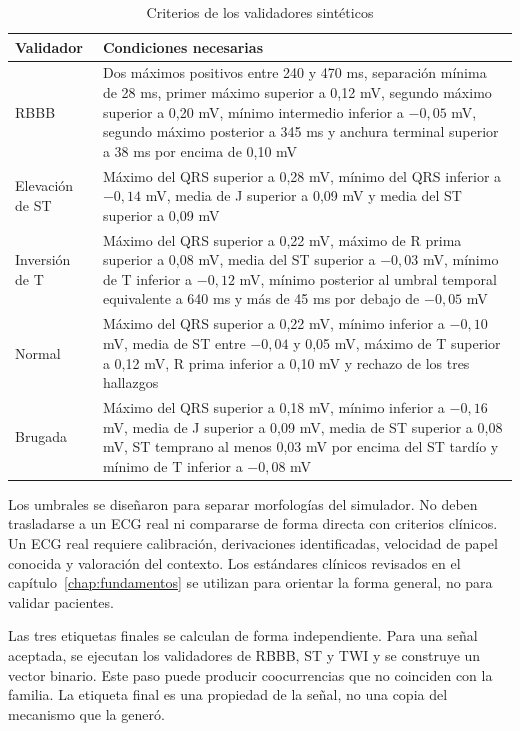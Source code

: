 \begin{table}[H]
\centering
\scriptsize
\begin{tabularx}{\textwidth}{p{2.25cm} X}
\toprule
\textbf{Validador} & \textbf{Condiciones necesarias} \\
\midrule
RBBB &
Dos máximos positivos entre 240 y 470 ms, separación mínima de 28 ms, primer máximo superior a 0,12 mV, segundo máximo superior a 0,20 mV, mínimo intermedio inferior a \(-0,05\) mV, segundo máximo posterior a 345 ms y anchura terminal superior a 38 ms por encima de 0,10 mV \\
Elevación de ST &
Máximo del QRS superior a 0,28 mV, mínimo del QRS inferior a \(-0,14\) mV, media de J superior a 0,09 mV y media del ST superior a 0,09 mV \\
Inversión de T &
Máximo del QRS superior a 0,22 mV, máximo de R prima superior a 0,08 mV, media del ST superior a \(-0,03\) mV, mínimo de T inferior a \(-0,12\) mV, mínimo posterior al umbral temporal equivalente a 640 ms y más de 45 ms por debajo de \(-0,05\) mV \\
Normal &
Máximo del QRS superior a 0,22 mV, mínimo inferior a \(-0,10\) mV, media de ST entre \(-0,04\) y 0,05 mV, máximo de T superior a 0,12 mV, R prima inferior a 0,10 mV y rechazo de los tres hallazgos \\
Brugada &
Máximo del QRS superior a 0,18 mV, mínimo inferior a \(-0,16\) mV, media de J superior a 0,09 mV, media de ST superior a 0,08 mV, ST temprano al menos 0,03 mV por encima del ST tardío y mínimo de T inferior a \(-0,08\) mV \\
\bottomrule
\end{tabularx}
\caption{Criterios de los validadores sintéticos}
\label{tab:validadores}
\end{table}

Los umbrales se diseñaron para separar morfologías del simulador. No deben trasladarse a un ECG real ni compararse de forma directa con criterios clínicos. Un ECG real requiere calibración, derivaciones identificadas, velocidad de papel conocida y valoración del contexto. Los estándares clínicos revisados en el capítulo~\ref{chap:fundamentos} se utilizan para orientar la forma general, no para validar pacientes.

Las tres etiquetas finales se calculan de forma independiente. Para una señal aceptada, se ejecutan los validadores de RBBB, ST y TWI y se construye un vector binario. Este paso puede producir coocurrencias que no coinciden con la familia. La etiqueta final es una propiedad de la señal, no una copia del mecanismo que la generó.

